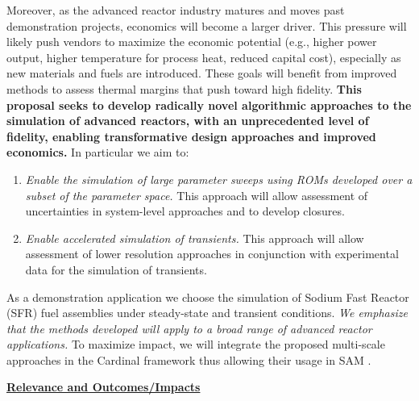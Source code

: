 Moreover, as the advanced reactor industry matures and moves past demonstration
projects, economics will become a larger driver. This pressure will likely push
vendors to maximize the economic potential (e.g., higher power output,
higher temperature for process heat, reduced capital cost), especially as new
materials and fuels are introduced. These goals will benefit from
improved methods to assess thermal margins that push toward high fidelity.
\textbf{This proposal seeks to develop radically novel algorithmic approaches
to the simulation of advanced reactors, with an unprecedented level of
fidelity, enabling transformative design approaches and improved economics.}
In particular we aim to: \\[-2ex]
\begin{enumerate}
%
   \item \textit{Enable the simulation of large parameter sweeps using
   ROMs developed over a subset of the parameter space.} This approach
   will allow assessment of uncertainties in system-level approaches 
   and to develop closures.
%
   \item \textit{Enable accelerated simulation of transients.}
   This approach will allow assessment of lower resolution approaches in
   conjunction with experimental data for the simulation of transients.
\\[-2ex]
\end{enumerate}
As a demonstration application we choose the simulation of Sodium Fast Reactor
(SFR) fuel assemblies under steady-state and transient conditions. \textit{We
emphasize that the methods developed will apply to a broad range of advanced
reactor applications.} To maximize impact, we will integrate the proposed
multi-scale approaches in the Cardinal \cite{cardinal} framework thus allowing
their usage in SAM \cite{hu2021}. 








\vspace*{.05in}\noindent \underline{\textbf{Relevance and Outcomes/Impacts}} \\[-2ex]




